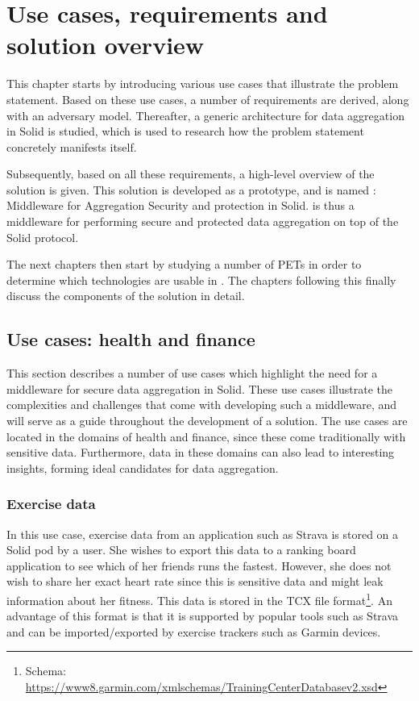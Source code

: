 \chapter{Use cases, requirements and solution overview}
\label{cha:solution-overview}
This chapter starts by introducing various use cases that illustrate the problem statement. Based on these use cases, a number of requirements are derived, along with an adversary model. Thereafter, a generic architecture for data aggregation in Solid is studied, which is used to research how the problem statement concretely manifests itself. 

Subsequently, based on all these requirements, a high-level overview of the solution is given. This solution is developed as a prototype, and is named \middleware{}: Middleware for Aggregation Security and protection in Solid. \middleware{} is thus a middleware for performing secure and protected data aggregation on top of the Solid protocol. 

The next chapters then start by studying a number of \gls{PETs} in order to determine which technologies are usable in \middleware{}. The chapters following this finally discuss the components of the solution in detail.

\section{Use cases: health and finance}
\label{sec:usecases}
This section describes a number of use cases which highlight the need for a middleware for secure data aggregation in Solid. These use cases illustrate the complexities and challenges that come with developing such a middleware, and will serve as a guide throughout the development of a solution. The use cases are located in the domains of health and finance, since these come traditionally with sensitive data. Furthermore, data in these domains can also lead to interesting insights, forming ideal candidates for data aggregation.

\subsection{Exercise data}
\label{usecase:ex-data}
In this use case, exercise data from an application such as Strava is stored on a Solid pod by a user. She wishes to export this data to a ranking board application to see which of her friends runs the fastest. However, she does not wish to share her exact heart rate since this is sensitive data and might leak information about her fitness. This data is stored in the TCX file format\footnote{Schema: \url{https://www8.garmin.com/xmlschemas/TrainingCenterDatabasev2.xsd}}. An advantage of this format is that it is supported by popular tools such as Strava and can be imported/exported by exercise trackers such as Garmin devices.

